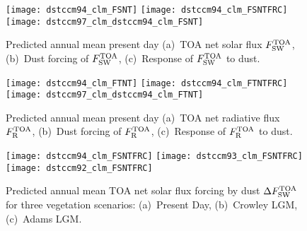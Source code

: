 \documentclass[final,dvips]{foils}
\begin{document}
\foilhead{\bgp
\Large\textcolor{blue}{\hfill Solar Radiative Forcing \& Response \hfill}}\vspace{-0.5in}\large
\begin{figure}
\centering
\texttt{[image: dstccm94\_clm\_FSNT]}\vfill
\texttt{[image: dstccm94\_clm\_FSNTFRC]}\vfill
\texttt{[image: dstccm97\_clm\_dstccm94\_clm\_FSNT]}\vfill
\caption{
Predicted annual mean present day 
(a)~TOA net solar flux $\flxnetswtoa$, 
(b)~Dust forcing of $\flxnetswtoa$, 
(c)~Response of $\flxnetswtoa$ to dust.
\label{fgr:dstodxc}}
\end{figure}

\foilhead{\bgp
\Large\textcolor{blue}{\hfill Total Radiative Forcing \& Response \hfill}}\vspace{-0.5in}\large
\begin{figure}
\centering
\texttt{[image: dstccm94\_clm\_FTNT]}\vfill
\texttt{[image: dstccm94\_clm\_FTNTFRC]}\vfill
\texttt{[image: dstccm97\_clm\_dstccm94\_clm\_FTNT]}\vfill
\caption{
Predicted annual mean present day 
(a)~TOA net radiative flux $F^{\mbox{\scriptsize TOA}}_{\mbox{\scriptsize R}}$, 
(b)~Dust forcing of $F^{\mbox{\scriptsize TOA}}_{\mbox{\scriptsize R}}$, 
(c)~Response of $F^{\mbox{\scriptsize TOA}}_{\mbox{\scriptsize R}}$ to dust.
\label{fgr:dstodxc}}
\end{figure}

\foilhead{\bgp
\Large\textcolor{blue}{\hfill Sensitivity of $\flxnetswtoa$ to Vegetation \hfill}}\vspace{-0.5in}\large
\begin{figure}
\centering
\texttt{[image: dstccm94\_clm\_FSNTFRC]}\vfill
\texttt{[image: dstccm93\_clm\_FSNTFRC]}\vfill
\texttt{[image: dstccm92\_clm\_FSNTFRC]}
\caption{
Predicted annual mean TOA net solar flux forcing by dust
$\Delta F^{\mbox{\scriptsize TOA}}_{\mbox{\scriptsize SW}}$ for three vegetation scenarios:
(a)~Present Day, (b)~Crowley LGM, (c)~Adams LGM.
\label{fgr:dstodxc}}
\end{figure}
\end{document}
